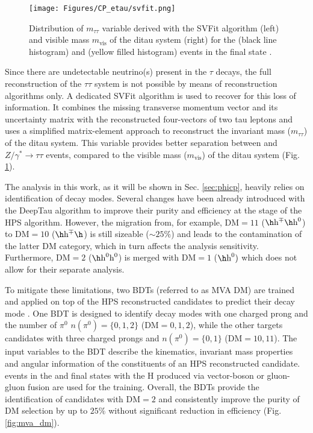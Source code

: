 \begin{figure}[t!]
    \centering
    \texttt{[image: Figures/CP\_etau/svfit.png]}
    \caption{Distribution of $m_{\tau\tau}$ variable derived with the SVFit algorithm (left) and visible mass $m_\text{vis}$ of the ditau system (right) for the \htt (black line histogram) and \ztt (yellow filled histogram) events in the \mt final state \cite{Bianchini:2014vza}.}
    \label{fig:svfit}
\end{figure}

Since there are undetectable neutrino(s) present in the $\tau$ decays, the full reconstruction of the $\tau\tau$ system is not possible by means of \tauh reconstruction algorithms only. A dedicated SVFit algorithm \cite{Bianchini:2014vza} is used to recover for this loss of information. It combines the missing transverse momentum vector \met and its uncertainty matrix with the reconstructed four-vectors of two tau leptons and uses a simplified matrix-element approach to reconstruct the invariant mass ($m_{\tau\tau}$) of the ditau system. This variable provides better separation between \htt and $Z/\gamma^*\to\tau\tau$ events, compared to the visible mass ($m_\text{vis}$) of the ditau system (Fig. \ref{fig:svfit}).    

The analysis in this work, as it will be shown in Sec. \ref{sec:phicp}, heavily relies on identification of \tauh decay modes. Several changes have been already introduced with the DeepTau algorithm to improve their purity and efficiency at the stage of the HPS algorithm. However, the migration from, for example, $\text{DM}=11$ ($\h\text{h}^\mp\h\text{h}^0$) to $\text{DM}=10$ ($\h\text{h}^\mp\h$) is still sizeable ($\sim25\%$) and leads to the contamination of the latter DM category, which in turn affects the analysis sensitivity. Furthermore, $\text{DM}=2$ ($\h\text{h}^0\text{h}^0$) is merged with $\text{DM}=1$ ($\h\text{h}^0)$ which does not allow for their separate analysis. 

To mitigate these limitations, two BDTs (referred to as MVA DM) are trained and applied on top of the HPS reconstructed \tauh candidates to predict their decay mode \cite{CMS-DP-2020-041}. One BDT is designed to identify decay modes with one charged prong and the number of $\pi^0$ $n(\pi^0) = \{0,1,2\}$ ($\text{DM}=0,1,2$), while the other targets \tauh candidates with three charged prongs and $n(\pi^0) = \{0,1\}$ ($\text{DM}=10,11$). The input variables to the BDT describe the kinematics, invariant mass properties and angular information of the constituents of an HPS reconstructed \tauh candidate. \htt events in the \mt and \tata final states with the H produced via vector-boson or gluon-gluon fusion are used for the training. Overall, the BDTs provide the identification of \tauh candidates with $\text{DM}=2$ and consistently improve the purity of DM selection by up to $25\%$ without significant reduction in efficiency (Fig. \ref{fig:mva_dm}).  

